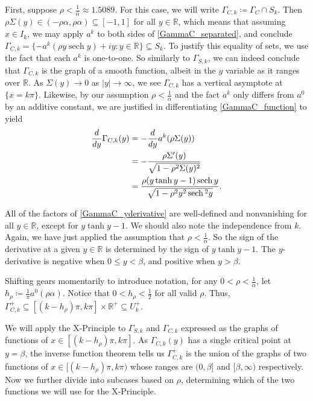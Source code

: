 \documentclass{amsart}
\theoremstyle{plain}
\numberwithin{theorem}{section}
\DeclareMathOperator{\sech}{sech}
\theoremstyle{definition}
\theoremstyle{remark}
\theoremstyle{brakets}
\newcommand{\R}{\mathbb{R}}
\begin{document}
First, suppose $\rho < \frac{1}{\alpha} \approx 1.5089$. For this case, we will write $\Gamma_{C,k} \coloneq \Gamma_C \cap S_k$. Then $\rho \Sigma(y)\in (-\rho\alpha,\rho\alpha) \subseteq[-1,1]$ for all $y \in \R$, which means that assuming $x \in I_k$, we may apply $a^k$ to both sides of \eqref{GammaC_separated}, and conclude $\Gamma_{C,k} = \{-a^k(\rho y \sech y) + iy : y \in \R\} \subseteq S_k$. To justify this equality of sets, we use the fact that each $a^k$ is one-to-one. So similarly to $\Gamma_{S,k}$, we can indeed conclude that $\Gamma_{C,k}$ is the graph of a smooth function, albeit in the $y$ variable as it ranges over $\R$.  As $\Sigma(y) \to 0$ as $|y| \to \infty$, we see $\Gamma_{C,k}$ has a vertical asymptote at $\{x = k\pi\}$. Likewise, by our assumption $\rho < \frac{1}{\alpha}$ and the fact $a^k$ only differs from $a^0$ by an additive constant, we are justified in differentiating \eqref{GammaC_function} to yield
\begin{align}
    \frac{d}{dy} \Gamma_{C,k}(y) &= -\frac{d}{dy} a^k(\rho\Sigma(y)) \nonumber\\
    &= -\frac{\rho\Sigma'(y)}{\sqrt{1 - \rho^2\Sigma(y)^2}} \nonumber\\
    &= \frac{\rho (y \tanh y - 1) \sech y}{\sqrt{1 - \rho^2 y^2 \sech\mathstrut^2 y}}. \label{GammaC_yderivative}
\end{align}

All of the factors of \eqref{GammaC_yderivative} are well-defined and nonvanishing for all $y \in \R$, except for $y\tanh y - 1$. We should also note the independence from $k$. Again, we have just applied the assumption that $\rho < \frac{1}{\alpha}$. So the sign of the derivative at a given $y \in \R$ is determined by the sign of $y \tanh y - 1$. The $y$-derivative is negative when $0 \leq y < \beta$, and positive when $y > \beta$.

Shifting gears momentarily to introduce notation, for any $0 < \rho < \frac{1}{\alpha}$, let $h_\rho \coloneq \frac{1}{\pi}a^0(\rho\alpha)$. Notice that $0 < h_{\rho} < \frac{1}{2}$ for all valid $\rho$. Thus, $\Gamma_{C,k}^+ \subseteq [(k-h_\rho)\pi,k\pi] \times \R^+ \subseteq U_k^+$. 

We will apply the X-Principle to $\Gamma_{S,k}$ and $\Gamma_{C,k}$ expressed as the graphs of functions of $x \in [(k-h_\rho)\pi,k\pi]$. As $\Gamma_{C,k}(y)$ has a single critical point at $y = \beta$, the inverse function theorem tells us $\Gamma_{C,k}^+$ is the union of the graphs of two functions of $x \in [(k-h_\rho)\pi,k\pi)$ whose ranges are $(0,\beta]$ and $[\beta,\infty)$ respectively. Now we further divide into subcases based on $\rho$, determining which of the two functions we will use for the X-Principle. 
\end{document}
